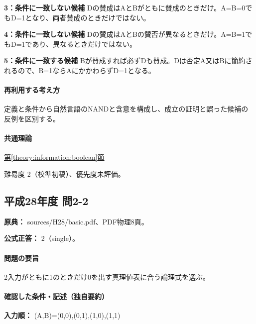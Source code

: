 \noindent\textbf{3：条件に一致しない候補} Dの賛成はAとBがともに賛成のときだけ。A=\allowbreak{}B=\allowbreak{}0でもD=\allowbreak{}1となり、両者賛成のときだけではない。\par

\noindent\textbf{4：条件に一致しない候補} Dの賛成はAとBの賛否が異なるときだけ。A=\allowbreak{}B=\allowbreak{}1でもD=\allowbreak{}1であり、異なるときだけではない。\par

\noindent\textbf{5：条件に一致する候補} Bが賛成すれば必ずDも賛成。Dは否定A又はBに簡約されるので、B=\allowbreak{}1ならAにかかわらずD=\allowbreak{}1となる。\par

\paragraph{再利用する考え方} 定義と条件から自然言語のNANDと含意を構成し、成立の証明と誤った候補の反例を区別する。

\paragraph{共通理論} \hyperref[theory:information:boolean]{第\ref*{theory:information:boolean}節}

\par 難易度 2（校準初稿）、優先度未評価。

\subsection{平成28年度 問2-2}
\label{q:h28-reg-basic-2-2}

\noindent\textbf{原典：} sources/H28/basic.pdf、PDF物理8頁。

\textbf{公式正答：} 2（single）。

\paragraph{問題の要旨} 2入力がともに1のときだけ0を出す真理値表に合う論理式を選ぶ。

\paragraph{確認した条件・記述（独自要約）}\mbox{}\par

\noindent\textbf{入力順：} (A,B)=\allowbreak{}(0,0),(0,1),(1,0),(1,1)\par

